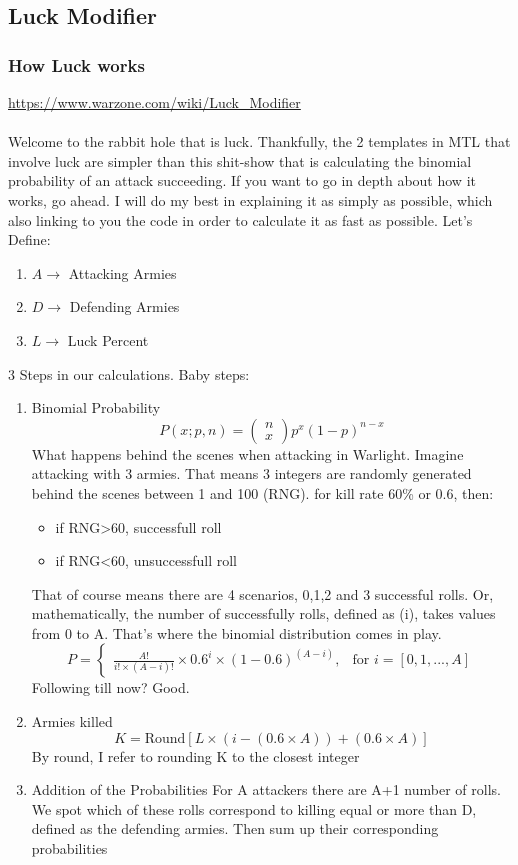 \subsection{Luck Modifier}

\subsubsection{How Luck works}

\url{https://www.warzone.com/wiki/Luck_Modifier}
\\
\\
Welcome to the rabbit hole that is luck. Thankfully, the 2 templates in MTL that involve luck are simpler than this shit-show that is calculating the binomial probability of an attack succeeding. If you want to go in depth about how it works, go ahead. I will do my best in explaining it as simply as possible, which also linking to you the code in order to calculate it as fast as possible. Let's Define:
\begin{enumerate}
    \item $A \rightarrow$ Attacking Armies
    \item $D \rightarrow$ Defending Armies
    \item $L \rightarrow$ Luck Percent
\end{enumerate}

3 Steps in our calculations. Baby steps:
\begin{enumerate}
    \item Binomial Probability
    $$ P(x;p,n) = \begin{pmatrix}{} n \\ x \end{pmatrix} {p}^x(1-p)^{n-x} $$
    What happens behind the scenes when attacking in Warlight. Imagine attacking with 3 armies. That means 3 integers are randomly generated behind the scenes between 1 and 100 (RNG). for kill rate 60\% or 0.6, then:
    \begin{itemize}
        \item if RNG>60, successfull roll
        \item if RNG<60, unsuccessfull roll
    \end{itemize}
    That of course means there are 4 scenarios, 0,1,2 and 3 successful rolls. Or, mathematically, the number of successfully rolls, defined as (i), takes values from 0 to A. That's where the binomial distribution comes in play.
    $$ P = \begin{cases}
    \frac{A!}{i! \times(A-i)!} \times 0.6^i \times (1-0.6)^{(A-i)}, & \text{for } i=[0,1,...,A]
    \end{cases}
    $$
    Following till now? Good.
    \item Armies killed
    $$ K = \text{Round}[L\times(i-(0.6 \times A))+(0.6 \times A)] $$
    By round, I refer to rounding K to the closest integer
    \item Addition of the Probabilities
    For A attackers there are A+1 number of rolls. We spot which of these rolls correspond to killing equal or more than D, defined as the defending armies. Then sum up their corresponding probabilities
\end{enumerate}

